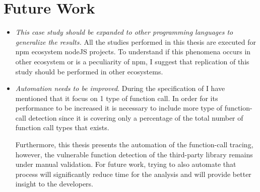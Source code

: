 \section{Future Work}
\begin{itemize}
    \item \textit{This case study should be expanded to other programming languages to generalize the results.} All the studies performed in this thesis are executed for npm ecosystem nodeJS projects. To understand if this phenomena occurs in other ecosystem or is a peculiarity of npm, I suggest that replication of this study should be performed in other ecosystems.
   
    \item \textit{Automation needs to be improved}. During the specification of \tool[] I have mentioned that it focus on 1 type of function call. In order for its performance to be increased it is necessary to include more type of function-call detection since it is covering only a percentage of the total number of function call types that exists.
    
    Furthermore, this thesis presents the automation of the function-call tracing, however, the vulnerable function detection of the third-party library remains under manual validation. For future work, trying to also automate that process will significantly reduce time for the analysis and will provide better insight to the developers.
\end{itemize}

